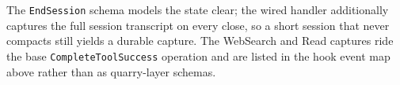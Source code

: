 \documentclass[a4paper,10pt,fleqn]{article}
\begin{document}
\noindent
The \texttt{EndSession} schema models the state clear; the wired
handler additionally captures the full session transcript on every
close, so a short session that never compacts still yields a durable
capture.  The WebSearch and Read captures ride the base
\texttt{CompleteToolSuccess} operation and are listed in the hook
event map above rather than as quarry-layer schemas.
\end{document}
